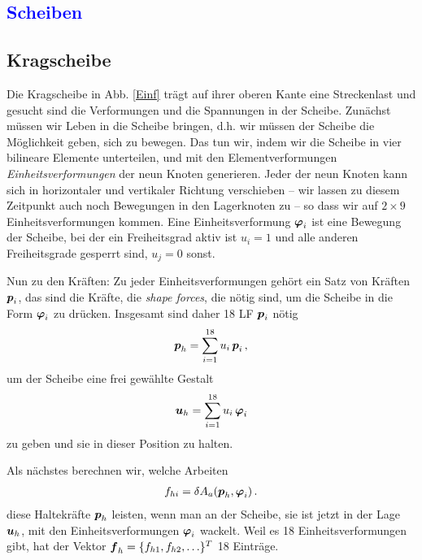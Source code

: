 \setcounter{chapter}{3}
{\textcolor{blue}{\chapter{Scheiben}}}

{\textcolor{sectionTitleBlue}{\section{Kragscheibe}}}
Die Kragscheibe in Abb. \ref{Einf} tr\"{a}gt auf ihrer oberen Kante eine Streckenlast und gesucht sind die Verformungen und die Spannungen in der Scheibe. Zun\"{a}chst m\"{u}ssen wir \glq Leben\grq{} in die Scheibe bringen, d.h.  wir m\"{u}ssen  der Scheibe die M\"{o}glichkeit geben, sich zu bewegen. Das tun wir, indem wir die Scheibe in vier bilineare Elemente unterteilen, und mit den Elementverformungen {\em Einheitsverformungen\/} der neun Knoten generieren. Jeder der neun Knoten kann sich in horizontaler und vertikaler Richtung verschieben -- wir lassen zu diesem Zeitpunkt auch noch Bewegungen in den Lagerknoten zu -- so dass wir auf $2 \times 9$ Einheitsverformungen kommen. Eine Einheitsverformung $\mbox{\boldmath $\varphi$}_i$ ist eine Bewegung der Scheibe, bei der ein Freiheitsgrad aktiv ist $u_i = 1 $ und alle anderen Freiheitsgrade gesperrt sind, $u_j = 0$ sonst.

Nun zu den Kr\"{a}ften: Zu jeder Einheitsverformungen geh\"{o}rt ein Satz von Kr\"{a}ften $\mbox{\boldmath $p$}_i$, das sind die Kr\"{a}fte, die {\em shape forces\/}, die n\"{o}tig sind, um die Scheibe in die Form $\mbox{\boldmath $\varphi$}_i $ zu dr\"{u}cken. Insgesamt sind daher 18 LF $\mbox{\boldmath $p$}_i$ n\"{o}tig
\begin{align}
\mbox{\boldmath $p$}_h = \sum_{i = 1}^{18} u_i\,\mbox{\boldmath $p$}_i\,,
\end{align}
um der Scheibe eine frei gew\"{a}hlte Gestalt
\begin{align}
\mbox{\boldmath $u$}_h =\sum_{i = 1}^{18} u_i\,\mbox{\boldmath $\varphi$}_i
\end{align}
zu geben und sie in dieser Position zu halten.

Als n\"{a}chstes berechnen wir, welche Arbeiten
\begin{align}
f_{hi} = \delta A_a(\mbox{\boldmath $p$}_h,\mbox{\boldmath $\varphi$}_i)\,.
\end{align}
diese Haltekr\"{a}fte $\mbox{\boldmath $p$}_h$ leisten, wenn man an der Scheibe, sie ist jetzt in der Lage $\mbox{\boldmath $u$}_h$, mit den Einheitsverformungen $\mbox{\boldmath $\varphi$}_i $ wackelt. Weil es 18 Einheitsverformungen gibt, hat der Vektor $\mbox{\boldmath $f$}_h = \{f_{h1}, f_{h2}, \ldots\}^T$ 18 Eintr\"{a}ge.

